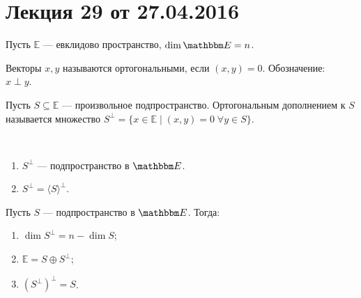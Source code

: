 


\renewcommand{\f}{\mathbb{f}}
\newcommand{\ort}{\mathrm{ort}}
\newcommand{\pr}{\mathrm{pr}}

\section{Лекция 29 от 27.04.2016}
Пусть $\mathbb{E}$ --- евклидово пространство, $\dim \E = n$.
\begin{Def}
	Векторы $x,y$ называются ортогональными, если $(x,y)=0$. Обозначение: \\$x\perp y$. 
\end{Def}

\begin{Def}
	Пусть $S \subseteq \mathbb{E}$ --- произвольное подпространство. Ортогональным дополнением к $S$ называется множество $S^{\perp} = \{x\in \mathbb{E}\; |\; (x,y) = 0\;\forall y \in S\}$.
\end{Def}

\begin{Comment}\
	\begin{enumerate}
		\item $S^\perp$ --- подпространство в $\E$.
		\item $S^\perp = \langle S \rangle^\perp$.
	\end{enumerate}
\end{Comment}

\begin{Suggestion}
Пусть $S$ --- подпространство в $\E$. Тогда:
	\begin{enumerate}
		\item $\dim S^\perp = n - \dim S$;
		\item $\mathbb{E} = S \oplus S^\perp$;
		\item $(S^\perp)^\perp = S$.
	\end{enumerate}
\end{Suggestion}

